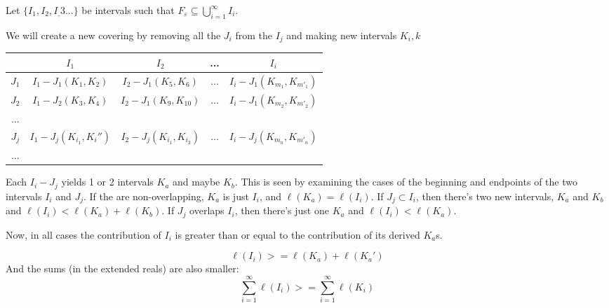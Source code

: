 \documentclass[11pt,oneside]{article}
\numberwithin{equation}{section}
\theoremstyle{definition}
\begin{document}
\begin{solution}
\begin{enumerate}[(a)]
      Let $ \{ I_1, I_2, I_,3 ... \}$ be intervals such that
      $ F _ \varepsilon  \subseteq \bigcup \limits _ {i=1} ^ \infty I_i$.

      We will create a new covering by removing all the $J_i$ from the
      $I_j$ and making new intervals $K_i,k$

      \begin{tabular}{ |c|c|c|c|c|}
        \hline
        \   & $I_1$   & $I_2$ & ... & $I_i$ \\
        \hline
        $J_1$ & $I_1 - J_1 (K_1, K_2)$ & $I_2 - J_1 (K_5, K_6)$ & ... & $I_i - J_1 (K_{m_1}, K_{m'_1})$ \\
        $J_2$ & $I_1 - J_2 (K_3, K_4)$ & $I_2 - J_1 (K_9, K_{10})$ & ... & $I_i - J_1 (K_{m_2}, K_{m'_2})$ \\
        ... &       &   &  &  \\
        $J_j$ & $I_1 - J_j (K_{i_1}, K_i'')$ & $I_2 - J_j (K_{i_1}, K_{i_2})$ & ... & $ I_i - J_j (K_{m_n}, K_{m'_n})$ \\
        ... &       &   &  &  \\
        \hline
      \end{tabular}
      Each $I_i - J_j$ yields 1 or 2 intervals $K_a$ and maybe $K_b$.
      This is seen by examining the cases of the beginning and
      endpoints of the two intervals $I_i$ and $J_j$.  If the are
      non-overlapping, $K_a$ is just $I_i$, and $ \ell(K_a) =
      \ell(I_i)$.  If $J_j \subset I_i$, then there's two new
      intervals, $K_a$ and $K_b$ and $\ell (I_i) < \ell (K_a) + \ell
      (K_b)$.  If $J_j$ overlaps $I_i$, then there's just one $K_a$ and
      $ \ell (I_i) < \ell (K_a)$.

      Now, in all cases the contribution of $I_i$ is greater than or
      equal to the contribution of its derived $K_a$s.  

      $$ \ell(I_i) >= \ell(K_a) + \ell(K_a')
      $$
      And the sums (in the extended reals) are also smaller:
      $$
      \sum \limits _ {i=1} ^ \infty \ell(I_i) >= \sum \limits _ { i = 1} ^ \infty \ell(K_i )
      $$
      
      
  \end{enumerate}
\end{solution}
\end{document}
